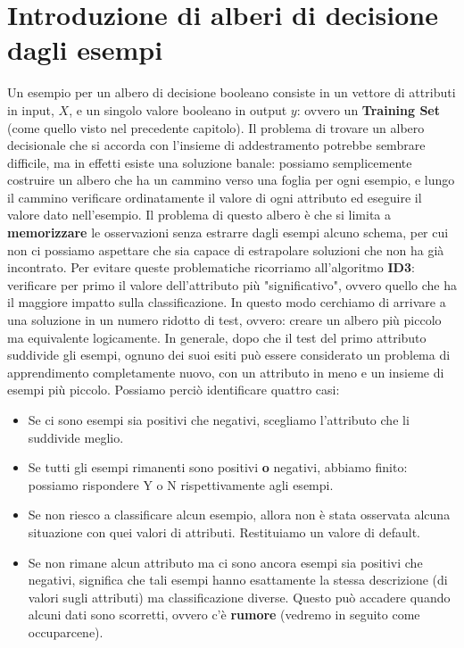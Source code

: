 \section{Introduzione di alberi di decisione dagli esempi}
Un esempio per un albero di decisione booleano consiste in un vettore di attributi in input, $X$, e un singolo valore booleano in output $y$: ovvero un \textbf{Training Set} (come quello visto nel precedente capitolo).
Il problema di trovare un albero decisionale che si accorda con l'insieme di addestramento potrebbe sembrare difficile, ma in effetti esiste una soluzione banale: possiamo semplicemente costruire un albero che ha un cammino verso una foglia per ogni esempio, e lungo il cammino verificare ordinatamente il valore di ogni attributo ed eseguire il valore dato nell'esempio. Il problema di questo albero è che si limita a \textbf{memorizzare} le osservazioni senza estrarre dagli esempi alcuno schema, per cui non ci possiamo aspettare che sia capace di estrapolare soluzioni che non ha già incontrato. Per evitare queste problematiche ricorriamo all'algoritmo \textbf{ID3}: verificare per primo il valore dell'attributo più "significativo", ovvero quello che ha il maggiore impatto sulla classificazione. In questo modo cerchiamo di arrivare a una soluzione in un numero ridotto di test, ovvero: creare un albero più piccolo ma equivalente logicamente. In generale, dopo che il test del primo attributo suddivide gli esempi, ognuno dei suoi esiti può essere considerato un problema di apprendimento completamente nuovo, con un attributo in meno e un insieme di esempi più piccolo. Possiamo perciò identificare quattro casi:
\begin{itemize}
    \item Se ci sono esempi sia positivi che negativi, scegliamo l'attributo che li suddivide meglio.
    \item Se tutti gli esempi rimanenti sono positivi \textbf{o} negativi, abbiamo finito: possiamo rispondere Y o N rispettivamente agli esempi.
    \item Se non riesco a classificare alcun esempio, allora non è stata osservata alcuna situazione con quei valori di attributi. Restituiamo un valore di default.
    \item Se non rimane alcun attributo ma ci sono ancora esempi sia positivi che negativi, significa che tali esempi hanno esattamente la stessa descrizione (di valori sugli attributi) ma classificazione diverse. Questo può accadere quando alcuni dati sono scorretti, ovvero c'è \textbf{rumore} (vedremo in seguito come occuparcene).
\end{itemize}
